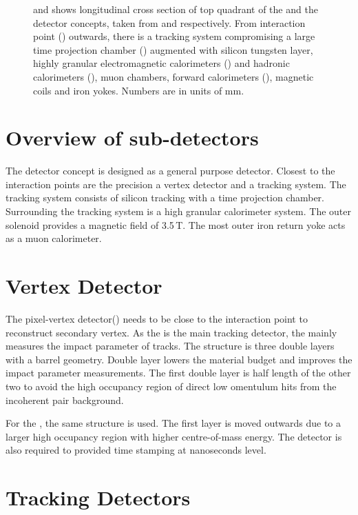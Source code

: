 \begin{figure}[tdbph]
\begin{subfigure}[b]{0.35\textwidth}
    \caption{}
    \label{fig:CLIC_ILD}
  \end{subfigure}
\caption[]
{ and  shows longitudinal cross section of top quadrant of the \ILD and the \CLICILD detector concepts, taken from \cite{Baer:2013cma} and \cite{Linssen:2012hp} respectively. From interaction point (\IP) outwards, there is a tracking system compromising a large time projection chamber (\TPC) augmented with silicon tungsten layer, highly granular electromagnetic calorimeters (\ECAL) and hadronic calorimeters (\HCAL), muon chambers, forward calorimeters (\FCAL), magnetic coils and iron yokes. Numbers are in units of mm.}
\label{fig:detectorILD}
\end{figure}




\section{Overview of \ILD sub-detectors}

The \ILD detector concept is designed as a general purpose detector. Closest to the interaction points are the precision a vertex detector and a tracking system. The tracking system consists of silicon tracking with a time projection chamber. Surrounding the tracking system is a high granular calorimeter system. The outer solenoid provides a magnetic field of 3.5\,T. The most outer iron return yoke acts as a muon calorimeter.


\section{Vertex Detector}

The pixel-vertex detector(\VTX) needs to be close to the interaction point to reconstruct secondary vertex. As the \TPC is the main tracking  detector, the \VTX mainly measures the impact parameter of tracks. The structure is three double layers with a barrel geometry. Double layer lowers the material budget and improves the impact parameter measurements. The first double layer is half length of the other two to avoid the high occupancy region of direct low omentulum hits from the incoherent pair background.

For the \CLIC, the same structure is used. The first layer is moved outwards due to a larger high occupancy region with higher centre-of-mass energy. The detector is also required to provided time stamping at nanoseconds level.


\section{Tracking Detectors}

